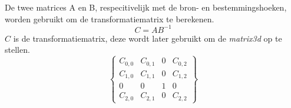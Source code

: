 De twee matrices A en B, respecitivelijk met de bron- en bestemmingshoeken, worden gebruikt om de transformatiematrix te berekenen.
$$ C = AB^{-1}$$
$C$ is de transformatiematrix, deze wordt later gebruikt om de {\it matrix3d} op te stellen. \cite{projectiveTransformation}
$$
\begin{Bmatrix}
C_{0,0}	& 	C_{0,1}	&	0	&	C_{0,2} 	\\
C_{1,0}	&	C_{1,1} 	&	0	&	C_{1,2} 	\\
0		&	0		&	1	&	0		\\
C_{2,0}	&	C_{2,1}	&	0	&	C_{2,2}
\end{Bmatrix}
$$
